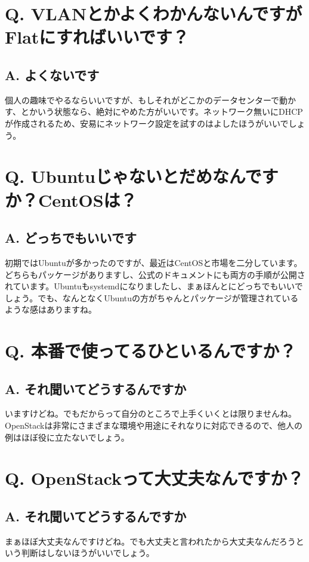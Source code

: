 \documentclass[9pt,b5paper,tombo,openany]{jsbook}
\begin{document}
\section*{Q. VLANとかよくわかんないんですがFlatにすればいいです？}
\subsection*{A. よくないです}
個人の趣味でやるならいいですが、もしそれがどこかのデータセンターで動かす、とかいう状態なら、絶対にやめた方がいいです。ネットワーク無いにDHCPが作成されるため、安易にネットワーク設定を試すのはよしたほうがいいでしょう。

\section*{Q. Ubuntuじゃないとだめなんですか？CentOSは？}
\subsection*{A. どっちでもいいです}
初期ではUbuntuが多かったのですが、最近はCentOSと市場を二分しています。どちらもパッケージがありますし、公式のドキュメントにも両方の手順が公開されています。Ubuntuもsystemdになりましたし、まぁほんとにどっちでもいいでしょう。でも、なんとなくUbuntuの方がちゃんとパッケージが管理されているような感はありますね。

\section*{Q. 本番で使ってるひといるんですか？}
\subsection*{A. それ聞いてどうするんですか}
いますけどね。でもだからって自分のところで上手くいくとは限りませんね。OpenStackは非常にさまざまな環境や用途にそれなりに対応できるので、他人の例はほぼ役に立たないでしょう。

\section*{Q. OpenStackって大丈夫なんですか？}
\subsection*{A. それ聞いてどうするんですか}
まぁほぼ大丈夫なんですけどね。でも大丈夫と言われたから大丈夫なんだろうという判断はしないほうがいいでしょう。
\end{document}
